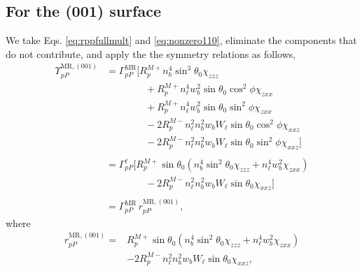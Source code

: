 \subsection{For the (001) surface}

We take Eqs. \eqref{eq:rppfullmult} and \eqref{eq:nonzero110}, eliminate the
components that do not contribute, and apply the the symmetry relations as
follows,
\begin{equation*}
\begin{split}
\Upsilon^{\mathrm{MR},(001)}_{pP} &=
\Gamma^{\mathrm{MR}}_{pP}
\big[
   R^{M+}_{p}n^{4}_{b}\sin^{3}\theta_{0}\chi_{zzz}\\
&\qquad\qquad+ R^{M+}_{p}n^{4}_{\ell}w^{2}_{b}\sin\theta_{0}\cos^{2}\phi
\chi_{zxx}\\
&\qquad\qquad+ R^{M+}_{p}n^{4}_{\ell}w^{2}_{b}\sin\theta_{0}\sin^{2}\phi
\chi_{zxx}\\
&\qquad\qquad- 2R^{M-}_{p}n^{2}_{\ell}n^{2}_{b}w_{b}W_{\ell}\sin\theta_{0}
\cos^{2}\phi\chi_{xxz}\\
&\qquad\qquad- 2R^{M-}_{p}n^{2}_{\ell}n^{2}_{b}w_{b}W_{\ell}\sin\theta_{0}
\sin^{2}\phi\chi_{xxz}
\big]\\\\
&=
\Gamma^{\ell}_{pP}
\big[
R^{M+}_{p}\sin\theta_{0}(n^{4}_{b}\sin^{2}\theta_{0}\chi_{zzz}
+ n^{4}_{\ell}w^{2}_{b}\chi_{zxx})\\
&\qquad\qquad- 2R^{M-}_{p}n^{2}_{\ell}n^{2}_{b}w_{b}W_{\ell}\sin\theta_{0}
\chi_{xxz}
\big]\\\\
&= \Gamma^{\mathrm{MR}}_{pP}\,r^{\mathrm{MR},(001)}_{pP},
\end{split}
\end{equation*}
where
\begin{equation}
\boxed{
\begin{split}
r^{\mathrm{MR},(001)}_{pP} = &R^{M+}_{p}\sin\theta_{0}(n^{4}_{b}\sin^{2}\theta_{0}\chi_{zzz}
+ n^{4}_{\ell}w^{2}_{b}\chi_{zxx})\\
&- 2R^{M-}_{p}n^{2}_{\ell}n^{2}_{b}w_{b}W_{\ell}\sin\theta_{0}\chi_{xxz},
\end{split}
}
\end{equation}

